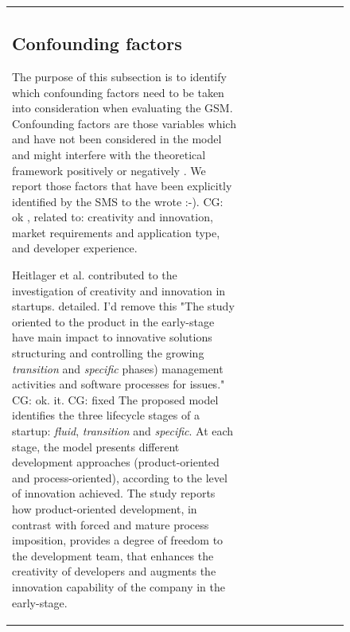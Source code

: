 \documentclass[12pt,journal,compsoc]{../sty/IEEEtran}
\begin{document}
\begin{table}[!t]
\begin{figure}[!t]
\begin{compactitem}
\begin{table}[!t]
\begin{tabular}{|l||c||c||c||c||c||c||c||c||c|}
\subsection{Confounding factors} \label{sect:an:comp:cat-vs-literature:conf}

The purpose of this subsection is to identify which confounding factors need to
be taken into consideration when evaluating the GSM. Confounding factors are
those variables which and have not been considered in the model and might
interfere with the theoretical framework positively or negatively
\cite{ColinRobson2009}. We report those factors that have been explicitly
identified by the SMS \cite{SMS} %
to the  %
wrote :-). CG: ok , related to: creativity and innovation, market requirements
and application  type, and developer experience.

Heitlager et al. \cite{Heitlager2007} contributed to the investigation of
creativity and innovation in startups.  %
detailed. I'd remove this "The study  %
oriented to the product in the early-stage  %
have main impact to innovative solutions  %
structuring and controlling the growing  %
\textit{transition} and \textit{specific} phases)  %
management activities and software processes for  %
issues."  CG: ok. %
it. CG: fixed The proposed model identifies the three lifecycle stages of a
startup:  \textit{fluid}, \textit{transition} and \textit{specific}. At each
stage, the  model presents different development approaches (product-oriented
and  process-oriented), according to the level of innovation achieved. The study
reports how product-oriented development, in contrast with forced and mature
process imposition, provides a degree of freedom to the development team, that
enhances the creativity of developers and augments the innovation capability of
the company in the early-stage.



\end{tabular}
\end{table}
\end{compactitem}
\end{figure}
\end{table}
\end{document}
